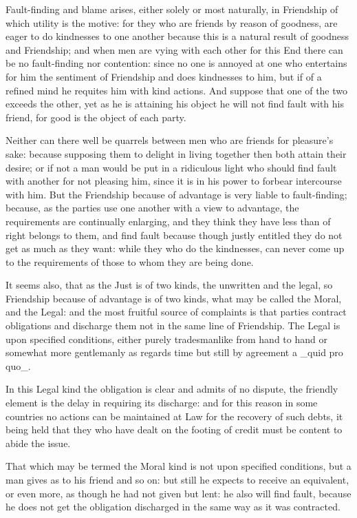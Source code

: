 Fault-finding and blame arises, either solely or most naturally, in
Friendship of which utility is the motive: for they who are friends by
reason of goodness, are eager to do kindnesses to one another because
this is a natural result of goodness and Friendship; and when men are
vying with each other for this End there can be no fault-finding nor
contention: since no one is annoyed at one who entertains for him the
sentiment of Friendship and does kindnesses to him, but if of a refined
mind he requites him with kind actions. And suppose that one of the two
exceeds the other, yet as he is attaining his object he will not find
fault with his friend, for good is the object of each party.

Neither can there well be quarrels between men who are friends for
pleasure's sake: because supposing them to delight in living together
then both attain their desire; or if not a man would be put in a
ridiculous light who should find fault with another for not pleasing
him, since it is in his power to forbear intercourse with him. But
the Friendship because of advantage is very liable to fault-finding;
because, as the parties use one another with a view to advantage, the
requirements are continually enlarging, and they think they have less
than of right belongs to them, and find fault because though justly
entitled they do not get as much as they want: while they who do the
kindnesses, can never come up to the requirements of those to whom they
are being done.

It seems also, that as the Just is of two kinds, the unwritten and the
legal, so Friendship because of advantage is of two kinds, what may
be called the Moral, and the Legal: and the most fruitful source of
complaints is that parties contract obligations and discharge them not
in the same line of Friendship. The Legal is upon specified conditions,
either purely tradesmanlike from hand to hand or somewhat more
gentlemanly as regards time but still by agreement a _quid pro quo_.

In this Legal kind the obligation is clear and admits of no dispute, the
friendly element is the delay in requiring its discharge: and for this
reason in some countries no actions can be maintained at Law for the
recovery of such debts, it being held that they who have dealt on the
footing of credit must be content to abide the issue.

That which may be termed the Moral kind is not upon specified
conditions, but a man gives as to his friend and so on: but still he
expects to receive an equivalent, or even more, as though he had not
given but lent: he also will find fault, because he does not get the
obligation discharged in the same way as it was contracted.

